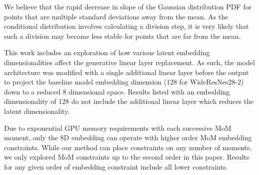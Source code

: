 \documentclass[10pt,twocolumn,letterpaper]{article}
\begin{document}
We believe that the rapid decrease in slope of the Gaussian distribution PDF for points that are multiple standard deviations away from the mean.  
As the conditional distribution involves calculating a division step, it is very likely that such a division may become less stable for points that are far from the mean.  

This work includes an exploration of how various latent embedding dimensionalities affect the generative linear layer replacement.
As such, the model architecture was modified with a single additional linear layer before the output to project the baseline model embedding dimension (128 for WideResNes28-2) down to a reduced 8 dimensional space.
Results listed with an embedding dimensionality of 128 do not include the additional linear layer which reduces the latent dimensionality. 

Due to exponential GPU memory requirements with each successive MoM moment, only the 8D embedding can operate with higher order MoM embedding constraints. 
While our method can place constraints on any number of moments, we only explored MoM constraints up to the second order in this paper. 
Results for any given order of embedding constraint include all lower constraints.

\end{document}
